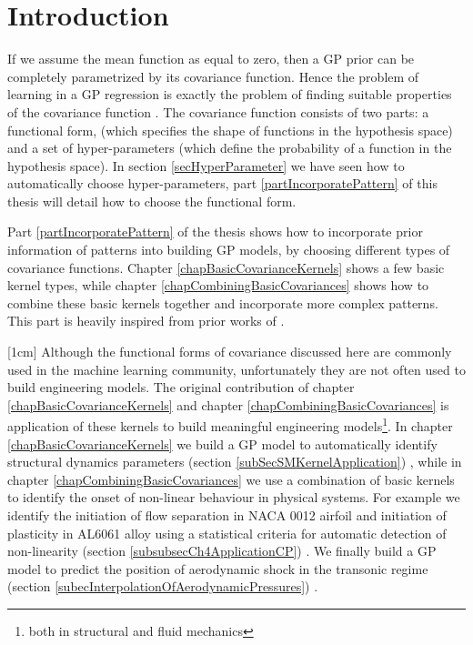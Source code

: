 
\section{Introduction}
If we assume the mean function as equal to zero, then a GP prior can be completely parametrized by its covariance function. Hence the problem of learning in a GP regression is exactly the problem of finding suitable properties of the covariance function \cite{Rasmussen2005}. The covariance function consists of two parts: a functional form, (which specifies the shape of functions in the hypothesis space) and a set of hyper-parameters (which define the probability of a function in the hypothesis space). In section \ref{secHyperParameter} we have seen how to automatically choose hyper-parameters, part \ref{partIncorporatePattern} of this thesis will detail how to choose the functional form. 

Part \ref{partIncorporatePattern} of the thesis shows how to incorporate prior information of patterns into building GP models, by choosing different types of covariance functions. Chapter \ref{chapBasicCovarianceKernels} shows a few basic kernel types, while chapter \ref{chapCombiningBasicCovariances} shows how to combine these basic kernels together and incorporate more complex patterns. This part is heavily inspired from prior works of \cite{duvenaud-thesis-2014, wilson2014thesis, lloyd2014automatic, durrande2001etude}. 

[1cm]
Although the functional forms of covariance discussed here are commonly used in the machine learning community, unfortunately they are not often used to build engineering models. The original contribution of chapter \ref{chapBasicCovarianceKernels} and chapter \ref{chapCombiningBasicCovariances} is application of these kernels to build meaningful engineering models\footnote{both in structural and fluid mechanics}. In chapter \ref{chapBasicCovarianceKernels} we build a GP model to automatically identify structural dynamics parameters (section \ref{subSecSMKernelApplication}) \cite{chiplunkar2017operational}, while in chapter \ref{chapCombiningBasicCovariances} we use a combination of basic kernels to identify the onset of non-linear behaviour in physical systems. For example we identify the initiation of flow separation in NACA 0012 airfoil and initiation of plasticity in AL6061 alloy using a statistical criteria for automatic detection of non-linearity (section \ref{subsubsecCh4ApplicationCP}) \cite{chiplunkar:hal-01555401}. We finally build a GP model to predict the position of aerodynamic shock in the transonic regime (section \ref{subecInterpolationOfAerodynamicPressures}) \cite{oatao18004}. 
  
